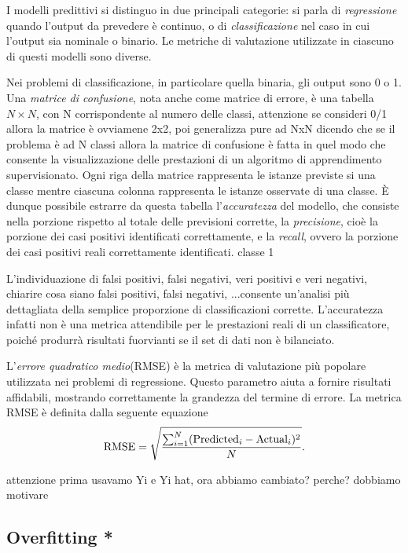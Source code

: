 I modelli predittivi si distinguo in due principali categorie: si parla di \emph{regressione} quando l'output da prevedere è continuo, o di \emph{classificazione} nel caso in cui l'output sia nominale o binario. Le metriche di valutazione utilizzate in ciascuno di questi modelli sono diverse.

Nei problemi di classificazione, in particolare quella binaria, gli output sono 0 o 1. 
Una \emph{matrice di confusione}, nota anche come matrice di errore, è una tabella $N \times N$, con N corrispondente al numero delle classi,{\color{red} attenzione se consideri 0/1 allora la matrice è ovviamene 2x2, poi generalizza pure ad NxN dicendo che se il problema è ad N classi allora la matrice di confusione è fatta in quel modo} che consente la visualizzazione delle prestazioni di un algoritmo di apprendimento supervisionato. Ogni riga della matrice rappresenta le istanze previste si una classe mentre ciascuna colonna rappresenta le istanze osservate di una classe. 
È dunque possibile estrarre da questa tabella l'\emph{accuratezza} del modello, che consiste nella porzione rispetto al totale delle previsioni corrette, la \emph{precisione}, cioè la porzione dei casi positivi identificati correttamente, e la \emph{recall}, ovvero la porzione dei casi positivi reali correttamente identificati. {\color{red} classe 1}

L'individuazione di falsi positivi, falsi negativi, veri positivi e veri negativi, {\color{red} chiarire cosa siano falsi positivi, falsi negativi, ...}consente un'analisi più dettagliata della semplice proporzione di classificazioni corrette. L'accuratezza infatti non è una metrica attendibile per le prestazioni reali di un classificatore, poiché produrrà risultati fuorvianti se il set di dati non è bilanciato.

L'\emph{errore quadratico medio}(RMSE) è la metrica di valutazione più popolare utilizzata nei problemi di regressione. Questo parametro aiuta a fornire risultati affidabili, mostrando correttamente la grandezza del termine di errore.
La metrica RMSE è definita dalla seguente equazione
\begin{equation}
	\operatorname{RMSE} = \sqrt{\frac{\sum_{i=1}^{N}(\mbox{Predicted}_i - \mbox{Actual}_i)^2}{N}} \mbox{.}
	\label{eq:rmse}
\end{equation}

{\color{red} attenzione prima usavamo Yi e Yi hat, ora abbiamo cambiato? perche? dobbiamo motivare}
\subsection{Overfitting *}
\label{subsec:overfitting}

